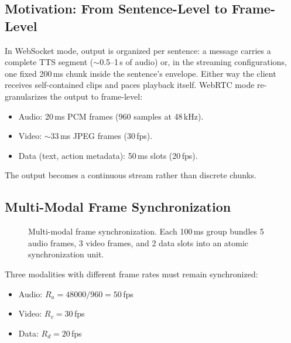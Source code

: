\documentclass[11pt,a4paper]{article}
\begin{document}
\subsection{Motivation: From Sentence-Level to Frame-Level}

In WebSocket mode, output is organized per sentence: a message carries a complete TTS segment ($\sim$0.5--1\,s of audio) or, in the streaming configurations, one fixed 200\,ms chunk inside the sentence's envelope. Either way the client receives self-contained clips and paces playback itself. WebRTC mode re-granularizes the output to frame-level:
\begin{itemize}[nosep]
    \item Audio: 20\,ms PCM frames (960 samples at 48\,kHz).
    \item Video: $\sim$33\,ms JPEG frames (30\,fps).
    \item Data (text, action metadata): 50\,ms slots (20\,fps).
\end{itemize}
The output becomes a continuous stream rather than discrete chunks.

\subsection{Multi-Modal Frame Synchronization}

\begin{figure}[h]
    \centering
    \caption{Multi-modal frame synchronization. Each 100\,ms group bundles 5 audio frames, 3 video frames, and 2 data slots into an atomic synchronization unit.}
    \label{fig:frame_sync}
\end{figure}

Three modalities with different frame rates must remain synchronized:
\begin{itemize}[nosep]
    \item Audio: $R_a = 48000 / 960 = 50$\,fps
    \item Video: $R_v = 30$\,fps
    \item Data: $R_d = 20$\,fps
\end{itemize}
\end{document}
